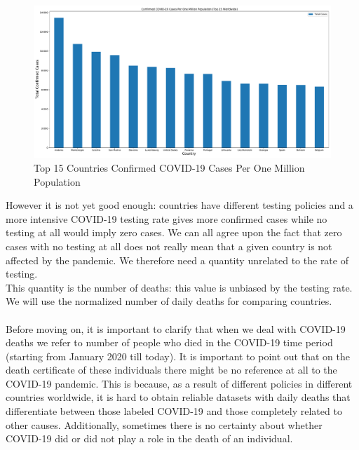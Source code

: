 \documentclass[11pt,a4paper]{article}
\begin{document}
\begin{figure}[H]
    \begin{center}
        \hspace*{-0.2cm}
        \includegraphics[scale=0.32]{img/total-cases-per-million.pdf}
    \end{center}
    \vspace{-0.2cm}
    \caption{Top 15 Countries Confirmed COVID-19 Cases Per One Million Population}
\end{figure}
\noindent
However it is not yet good enough: countries have different testing policies and
a more intensive COVID-19 testing rate gives more confirmed cases while no
testing at all would imply zero cases. We can all agree upon the fact that zero
cases with no testing at all does not really mean that a given country is not
affected by the pandemic. We therefore need a quantity unrelated to the rate of
testing.\\
This quantity is the number of deaths: this value is unbiased by the testing
rate. We will use the normalized number of daily deaths for comparing
countries.\\
\\
Before moving on, it is important to clarify that when we deal with COVID-19
deaths we refer to number of people who died in the COVID-19 time period
(starting from January 2020 till today). It is important to point out that
on the death certificate of these individuals there might be no reference at
all to the COVID-19 pandemic. This is because, as a result of different
policies in different countries worldwide, it is hard to obtain reliable
datasets with daily deaths that differentiate between those labeled COVID-19
and those completely related to other causes. Additionally, sometimes there is
no certainty about whether COVID-19 did or did not play a role in the death of
an individual.\\
\end{document}
